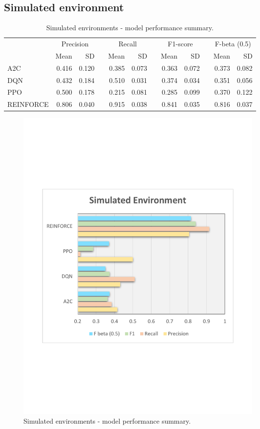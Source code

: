 \documentclass[a4paper, 12pt]{article}
\newcommand{\rowspace}[1]{\renewcommand{\arraystretch}{#1}}
\begin{document}
\subsection{Simulated environment}
\begin{table}[h]\centering\sffamily
	\rowspace{1.3}
	\begin{tabular}{@{}l rr c rr c rr c rr@{}}
		\arrayrulecolor{black!40}\toprule
		& \multicolumn{2}{c}{Precision} & \phantom{i} & \multicolumn{2}{c}{Recall} & \phantom{i} & \multicolumn{2}{c}{F1-score} & \phantom{i} & \multicolumn{2}{c}{F-beta (0.5)} \\
		\cmidrule{2-3} \cmidrule{5-6} \cmidrule{8-9} \cmidrule{11-12} 
		
		&Mean &SD & &Mean &SD & &Mean &SD& &Mean & SD\\ \midrule
		A2C & 0.416 & 0.120 & &0.385 & 0.073 & & 0.363 & 0.072 & &0.373 &0.082 \\
		DQN & 0.432 & 0.184 & &0.510 & 0.031 & & 0.374 & 0.034 & &0.351 &0.056 \\
		PPO & 0.500 & 0.178 & &0.215 & 0.081 & & 0.285 & 0.099 & &0.370 &0.122 \\
		REINFORCE & 0.806 & 0.040 & &0.915 & 0.038 & & 0.841 & 0.035 & &0.816 &0.037 \\
		
		
		\bottomrule
	\end{tabular}
	\caption{Simulated environments - model performance summary.}
	\label{tbl:SimulatedEnv}
\end{table}
\begin{figure}[h]
	\centering
	\includegraphics[width=0.6\textwidth, trim={1.5cm 7cm 1cm 7cm}]{images/SimulatedPlot.pdf}  
	\caption{Simulated environments - model performance summary.}
	\label{fig:SimulatedEnv}
\end{figure}
\end{document}
